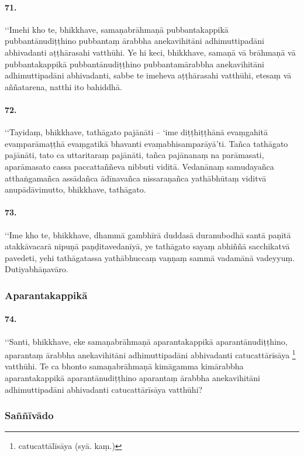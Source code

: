 \paragraph{71.}
‘‘Imehi kho te, bhikkhave, samaṇabrāhmaṇā pubbantakappikā pubbantānudiṭṭhino pubbantaṃ ārabbha anekavihitāni adhimuttipadāni abhivadanti aṭṭhārasahi vatthūhi. Ye hi keci, bhikkhave, samaṇā vā brāhmaṇā vā pubbantakappikā pubbantānudiṭṭhino pubbantamārabbha anekavihitāni adhimuttipadāni abhivadanti, sabbe te imeheva aṭṭhārasahi vatthūhi, etesaṃ vā aññatarena, natthi ito bahiddhā.

\paragraph{72.}
‘‘Tayidaṃ, bhikkhave, tathāgato pajānāti – ‘ime diṭṭhiṭṭhānā evaṃgahitā evaṃparāmaṭṭhā evaṃgatikā bhavanti evaṃabhisamparāyā’ti. Tañca tathāgato pajānāti, tato ca uttaritaraṃ pajānāti, tañca pajānanaṃ na parāmasati, aparāmasato cassa paccattaññeva nibbuti viditā. Vedanānaṃ samudayañca atthaṅgamañca assādañca ādīnavañca nissaraṇañca yathābhūtaṃ viditvā anupādāvimutto, bhikkhave, tathāgato.

\paragraph{73.}
‘‘Ime kho te, bhikkhave, dhammā gambhīrā duddasā duranubodhā santā paṇītā atakkāvacarā nipuṇā paṇḍitavedanīyā, ye tathāgato sayaṃ abhiññā sacchikatvā pavedeti, yehi tathāgatassa yathābhuccaṃ vaṇṇaṃ sammā vadamānā vadeyyuṃ. Dutiyabhāṇavāro.

\subsubsection{Aparantakappikā}

\paragraph{74.}
‘‘Santi, bhikkhave, eke samaṇabrāhmaṇā aparantakappikā aparantānudiṭṭhino, aparantaṃ ārabbha anekavihitāni adhimuttipadāni abhivadanti catucattārīsāya \footnote{catucattālīsāya (syā. kaṃ.)} vatthūhi. Te ca bhonto samaṇabrāhmaṇā kimāgamma kimārabbha aparantakappikā aparantānudiṭṭhino aparantaṃ ārabbha anekavihitāni adhimuttipadāni abhivadanti catucattārīsāya vatthūhi?

\subsubsection{Saññīvādo}

